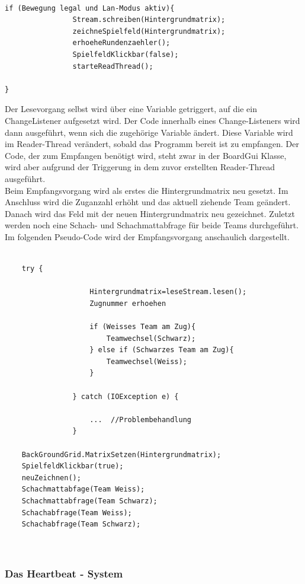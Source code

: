 \documentclass[12pt,a4paper]{article}
\begin{document}
\lstset{language=java}
\begin{lstlisting}

if (Bewegung legal und Lan-Modus aktiv){
				Stream.schreiben(Hintergrundmatrix);
				zeichneSpielfeld(Hintergrundmatrix);
				erhoeheRundenzaehler();
				SpielfeldKlickbar(false);
				starteReadThread();
				
}
\end{lstlisting}
Der Lesevorgang selbst wird über eine Variable getriggert, auf die ein ChangeListener aufgesetzt wird. Der Code innerhalb eines Change-Listeners wird dann ausgeführt, wenn sich die zugehörige Variable ändert. Diese Variable wird im Reader-Thread verändert, sobald das Programm bereit ist zu empfangen.
Der Code, der zum Empfangen benötigt wird, steht zwar in der BoardGui Klasse, wird aber aufgrund der Triggerung in dem zuvor erstellten Reader-Thread ausgeführt.\\[2ex]
Beim Empfangsvorgang wird als erstes die Hintergrundmatrix neu gesetzt. Im Anschluss wird die Zuganzahl erhöht und das aktuell ziehende Team geändert.
Danach wird das Feld mit der neuen Hintergrundmatrix neu gezeichnet. Zuletzt werden noch eine Schach- und Schachmattabfrage für beide Teams durchgeführt.\\[2ex]
Im folgenden Pseudo-Code wird der Empfangsvorgang anschaulich dargestellt.

\lstset{language=java}
\begin{lstlisting}

	try {

					Hintergrundmatrix=leseStream.lesen();
					Zugnummer erhoehen
					
					if (Weisses Team am Zug){
						Teamwechsel(Schwarz);
					} else if (Schwarzes Team am Zug){
						Teamwechsel(Weiss);
					}

				} catch (IOException e) {
					
					...  //Problembehandlung
				}

	BackGroundGrid.MatrixSetzen(Hintergrundmatrix);
	SpielfeldKlickbar(true);
	neuZeichnen();
	Schachmattabfage(Team Weiss);
	Schachmattabfrage(Team Schwarz);
	Schachabfrage(Team Weiss);
	Schachabfrage(Team Schwarz);
	


\end{lstlisting}


\subsubsection{Das Heartbeat - System}
\label{SUBSUBSEC:HEARTBEAT}
\end{document}

